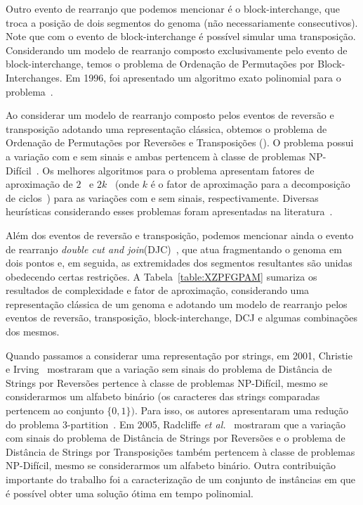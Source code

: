 Outro evento de rearranjo que podemos mencionar é o block-interchange, que troca a posição de dois segmentos do genoma (não necessariamente consecutivos). Note que com o evento de block-interchange é possível simular uma transposição. Considerando um modelo de rearranjo composto exclusivamente pelo evento de block-interchange, temos o problema de Ordenação de Permutações por Block-Interchanges. Em 1996, foi apresentado um algoritmo exato polinomial para o problema~\cite{1996-christie}.

Ao considerar um modelo de rearranjo composto pelos eventos de reversão e transposição adotando uma representação clássica, obtemos o problema de Ordenação de Permutações por Reversões e Transposições (\SbRT). O problema possui a variação com e sem sinais e ambas pertencem à classe de problemas NP-Difícil~\cite{2019b-oliveira-etal}. Os melhores algoritmos para o problema apresentam fatores de aproximação de $2$~\cite{1998-walter-etal} e $2k$~\cite{2008-rahman-etal} (onde $k$ é o fator de aproximação para a decomposição de ciclos~\cite{2013-chen}) para as variações com e sem sinais, respectivamente. Diversas heurísticas considerando esses problemas foram apresentadas na literatura~\cite{2014a-dias-etal,2018-brito-etal}.

Além dos eventos de reversão e transposição, podemos mencionar ainda o evento de rearranjo \emph{double cut and join}(DJC)~\cite{2005-yancopoulos-etal}, que atua fragmentando o genoma em dois pontos e, em seguida, as extremidades dos segmentos resultantes são unidas obedecendo certas restrições. A Tabela~\ref{table:XZPFGPAM} sumariza os resultados de complexidade e fator de aproximação, considerando uma representação clássica de um genoma e adotando um modelo de rearranjo pelos eventos de reversão, transposição, block-interchange, DCJ e algumas combinações dos mesmos. 



Quando passamos a considerar uma representação por strings, em 2001, Christie e Irving~\cite{2001-christie-irving} mostraram que a variação sem sinais do problema de Distância de Strings por Reversões pertence à classe de problemas NP-Difícil, mesmo se considerarmos um alfabeto binário (os caracteres das strings comparadas pertencem ao conjunto $\{0,1\})$. Para isso, os autores apresentaram uma redução do problema 3-partition~\cite{1990-garey-johnson}. Em 2005, Radcliffe \textit{et al.}~\cite{2005-radcliffe-etal} mostraram que a variação com sinais do problema de Distância de Strings por Reversões e o problema de Distância de Strings por Transposições também pertencem à classe de problemas NP-Difícil, mesmo se considerarmos um alfabeto binário. Outra contribuição importante do trabalho foi a caracterização de um conjunto de instâncias em que é possível obter uma solução ótima em tempo polinomial.

